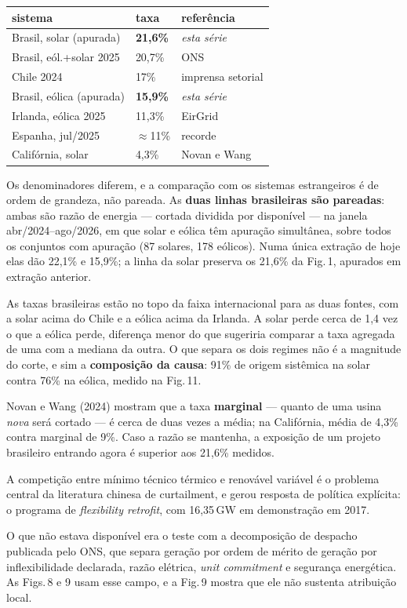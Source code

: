 \documentclass[10pt]{article}
\newcommand{\bloco}[1]{\vspace{2pt}{\color{vermelho}\footnotesize\textbf{#1}}\par\vspace{-2pt}}
\begin{document}
\begin{minipage}[t]{0.315\linewidth}\vspace{0pt}\footnotesize
\bloco{Comparação internacional}
\scriptsize
\begin{tabular}{@{}lll@{}}
\toprule
sistema & taxa & referência \\
\midrule
Brasil, solar (apurada) & \textbf{21,6\%} & \textit{esta série} \\
Brasil, eól.+solar 2025 & 20,7\% & ONS \\
Chile 2024 & 17\% & imprensa setorial \\
Brasil, eólica (apurada) & \textbf{15,9\%} & \textit{esta série} \\
Irlanda, eólica 2025 & 11,3\% & EirGrid \\
Espanha, jul/2025 & $\approx$11\% & recorde \\
Califórnia, solar & 4,3\% & Novan e Wang \\
\bottomrule
\end{tabular}
\par\vspace{3pt}\footnotesize
Os denominadores diferem, e a comparação com os sistemas estrangeiros é de ordem de
grandeza, não pareada. As \textbf{duas linhas brasileiras são pareadas}: ambas são razão
de energia --- cortada dividida por disponível --- na janela abr/2024--ago/2026, em que
solar e eólica têm apuração simultânea, sobre todos os conjuntos com apuração (87
solares, 178 eólicos). Numa única extração de hoje elas dão 22,1\% e 15,9\%; a linha da
solar preserva os 21,6\% da Fig.\,1, apurados em extração anterior.

As taxas brasileiras estão no topo da faixa internacional para as duas fontes, com a
solar acima do Chile e a eólica acima da Irlanda. A solar perde cerca de 1,4 vez o que a
eólica perde, diferença menor do que sugeriria comparar a taxa agregada de uma com a
mediana da outra. O que separa os dois regimes não é a magnitude do corte, e sim a
\textbf{composição da causa}: 91\% de origem sistêmica na solar contra 76\% na eólica,
medido na Fig.\,11.

Novan e Wang (2024) mostram que a taxa \textbf{marginal} --- quanto de uma usina
\textit{nova} será cortado --- é cerca de duas vezes a média; na Califórnia, média de
4,3\% contra marginal de 9\%. Caso a razão se mantenha, a exposição de um projeto
brasileiro entrando agora é superior aos 21,6\% medidos.

\bloco{Mecanismo e teste}
A competição entre mínimo técnico térmico e renovável variável é o problema central da
literatura chinesa de curtailment, e gerou resposta de política explícita: o programa de
\textit{flexibility retrofit}, com 16,35\,GW em demonstração em 2017.

O que não estava disponível era o teste com a decomposição de despacho publicada pelo
ONS, que separa geração por ordem de mérito de geração por inflexibilidade declarada,
razão elétrica, \textit{unit commitment} e segurança energética. As Figs.\,8 e 9 usam
esse campo, e a Fig.\,9 mostra que ele não sustenta atribuição local.
\end{minipage}\hfill
\end{document}
